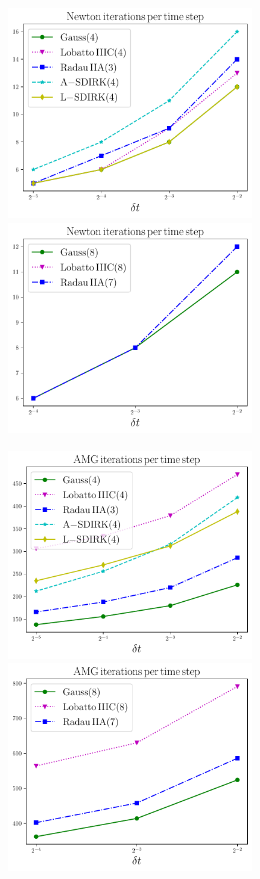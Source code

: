 \documentclass[review]{siamart}
\begin{document}
\begin{figure}[H]
\centerline{
\includegraphics[width = 0.575\textwidth]{figures/newton_iters_O4_dim2}
\quad
\includegraphics[width = 0.575\textwidth]{figures/newton_iters_O7_dim2}
}
\centerline{
\includegraphics[width = 0.575\textwidth]{figures/amg_iters_O4_dim2}
\quad
\includegraphics[width = 0.575\textwidth]{figures/amg_iters_O7_dim2}
}
\end{figure}
\end{document}
